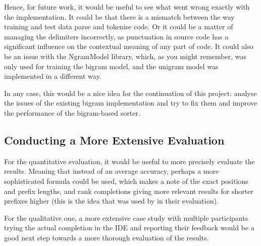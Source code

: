 Hence, for future work, it would be useful to see what went wrong exactly with the implementation. It could be that there is a mismatch between the way training and test data parse and tokenise code. Or it could be a matter of managing the delimiters incorrectly, as punctuation in source code has a significant influence on the contextual meaning of any part of code. It could also be an issue with the NgramModel library, which, as you might remember, was only used for training the bigram model, and the unigram model was implemented in a different way.

In any case, this would be a nice idea for the continuation of this project: analyse the issues of the existing bigram implementation and try to fix them and improve the performance of the bigram-based sorter. 
\subsection{Conducting a More Extensive Evaluation}
For the quantitative evaluation, it would be useful to more precisely evaluate the results. Meaning that instead of an average accuracy, perhaps a more sophisticated formula could be used, which makes a note of the exact positions and prefix lengths, and rank completions giving more relevant results for shorter prefixes higher (this is the idea that was used by \cite{Robb08a} in their evaluation).

For the qualitative one, a more extensive case study with multiple participants trying the actual completion in the IDE and reporting their feedback would be a good next step towards a more thorough evaluation of the results.